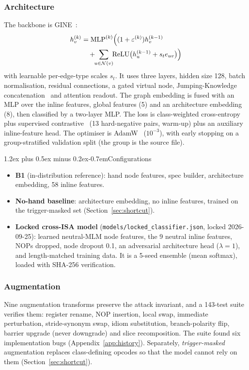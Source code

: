 \documentclass[conference]{IEEEtran}
\makeatletter
\renewcommand\paragraph{\@startsection{paragraph}{4}{\z@}%
  {1.2ex plus 0.5ex minus 0.2ex}{-0.7em}{\normalfont\normalsize\bfseries}}
\makeatother
\begin{document}
\subsubsection{Architecture}
The backbone is GINE~\cite{hu2020strategies}:
\begin{equation*}
\begin{split}
  h_v^{(k)} &= \text{MLP}^{(k)}\Bigl((1+\varepsilon^{(k)}) h_v^{(k-1)} \\
   &\quad + \!\!\sum_{u \in \mathcal{N}(v)}\!\! \text{ReLU}\bigl(h_u^{(k-1)} + s_{t} e_{uv}\bigr)\Bigr)
\end{split}
\end{equation*}
with learnable per-edge-type scales $s_t$. It uses three layers, hidden size
128, batch normalisation, residual connections, a gated virtual node,
Jumping-Knowledge concatenation~\cite{xu2018jk} and attention readout. The
graph embedding is fused with an MLP over the inline features, global features
(5) and an architecture embedding (8), then classified by a two-layer MLP. The
loss is class-weighted cross-entropy plus supervised
contrastive~\cite{khosla2020supervised} (13 hard-negative pairs, warm-up) plus
an auxiliary inline-feature head. The optimiser is AdamW~\cite{loshchilov2019decoupled}
($10^{-3}$), with early stopping on a group-stratified validation split (the
group is the source file).

\paragraph{Configurations}
\begin{itemize}[itemsep=1pt,leftmargin=1.2em]
  \item \textbf{B1} (in-distribution reference): hand node features,
    spec builder, architecture embedding, 58 inline features.
  \item \textbf{No-hand baseline}: architecture embedding, no inline features,
    trained on the trigger-masked set (Section~\ref{sec:shortcut}).
  \item \textbf{Locked cross-ISA model}
    (\texttt{models/locked\_classifier.json}, locked 2026-09-25): learned
    neutral-MLM node features, the 9 neutral inline features, NOPs dropped,
    node dropout 0.1, an adversarial architecture head ($\lambda=1$), and
    length-matched training data. It is a 5-seed ensemble (mean softmax),
    loaded with SHA-256 verification.
\end{itemize}

\subsubsection{Augmentation}
Nine augmentation transforms preserve the attack invariant, and a 143-test
suite verifies them: register rename, NOP insertion, local swap, immediate
perturbation, stride-synonym swap, idiom substitution, branch-polarity flip,
barrier upgrade (never downgrade) and slice recomposition. The suite found six
implementation bugs (Appendix~\ref{app:history}). Separately,
\emph{trigger-masked} augmentation replaces class-defining opcodes so that the
model cannot rely on them (Section~\ref{sec:shortcut}).
\end{document}
